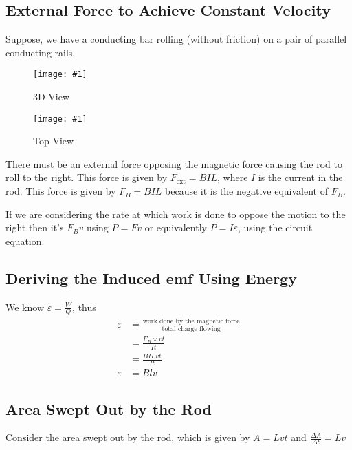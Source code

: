 \documentclass[a4paper,12pt]{article}
\newcommand{\img}[4]{\begin{center}
  \begin{figure}[H]
    \centering
    \texttt{[image: \#1]}
    \caption{#3}
    \label{fig:#4}
  \end{figure}
\end{center}}
\begin{document}
\subsection{External Force to Achieve Constant Velocity}

Suppose, we have a conducting bar rolling (without friction) on a pair of parallel conducting rails.

\begin{minipage}{0.5\textwidth}
  \img{rolling1.png}{1}{3D View}{rollingbar1}
\end{minipage}%
\begin{minipage}{0.5\textwidth}
  \img{rolling2.png}{1}{Top View}{rollingbar2}
\end{minipage}

There must be an external force opposing the magnetic force causing the rod to roll to the right. This force is given by $F_{\text{ext}} = BIL$, where $I$ is the current in the rod. This force is given by $F_B=BIL$ because it is the negative equivalent of $F_B$.

If we are considering the rate at which work is done to oppose the motion to the right then it's $F_Bv$ using $P = Fv$ or equivalently $P = I\varepsilon$, using the circuit equation.

\subsection{Deriving the Induced emf Using Energy}

We know $\varepsilon = \frac{W}{Q}$, thus
\bgroup
\addtolength{\jot}{1em}
\begin{align*}
  \varepsilon & = \frac{\text{work done by the magnetic force}}{\text{total charge flowing}} \\
              & = \frac{F_B\times vt}{It}                                                    \\
              & = \frac{BILvt}{It}                                                           \\
  \varepsilon & = Blv
\end{align*}
\egroup

\subsection{Area Swept Out by the Rod}

Consider the area swept out by the rod, which is given by $A = Lvt$ and $\frac{\Delta A}{\Delta t} = Lv$
\end{document}
